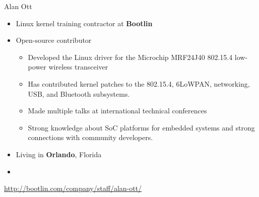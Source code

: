 \begin{frame}{Alan Ott}
    \begin{itemize}
      \item Linux kernel training contractor at {\bf Bootlin}
      \item Open-source contributor
        \begin{itemize}
	  \item Developed the Linux driver for the Microchip MRF24J40 802.15.4
		low-power wireless transceiver
	  \item Has contributed kernel patches to the 802.15.4, 6LoWPAN,
		networking, USB, and Bluetooth subsystems.
	  \item Made multiple talks at international technical conferences
	  \item Strong knowledge about SoC platforms for embedded
		systems and strong connections with community developers.
        \end{itemize}
      \item Living in {\bf Orlando}, Florida
      \item {}
    \end{itemize}
    {\small \url{http://bootlin.com/company/staff/alan-ott/}}
\end{frame}


